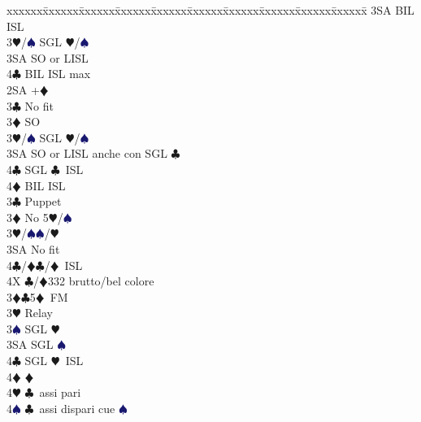 \documentclass[a4paper,italian]{article}
\newcommand{\BC}{\textcolor{OliveGreen}{$\clubsuit$}}
\newcommand{\BD}{\textcolor{RedOrange}{$\vardiamondsuit$}}
\newcommand{\BH}{\textcolor{Red2}{$\varheartsuit${}}}
\newcommand{\BS}{\textcolor{MidnightBlue}{$\spadesuit${}}}
\newenvironment{bidtable}
{\begin{tabbing}

    xxxxxx\=xxxxxx\=xxxxxx\=xxxxxx\=xxxxxx\=xxxxxx\=xxxxxx\=xxxxxx\=xxxxxx\=xxxxxx\=\kill}
{\end{tabbing} }%
\begin{document}
\begin{multicols}{2}
\begin{bidtable}
                                            3SA \> BIL ISL\-\-\\
                                            3\BH/\BS \> SGL \BH /\BS \\
                                            3SA \> SO or LISL\\
                                            4\BC \> BIL ISL max\-\-\\
                                            2SA +\BD \+\\
                                            3\BC \> No fit\+\\
                                            3\BD \> SO\\
                                            3\BH/\BS \> SGL \BH /\BS \\
                                            3SA \> SO or LISL anche con SGL \BC\\
                                            4\BC \> SGL \BC\ ISL\\
                                            4\BD \> BIL ISL\-\-\\
                                            3\BC \> Puppet\+\\
                                            3\BD \> No 5\BH /\BS \+\\
                                            3\BH/\BS {}\BS /\BH \+\\
                                            3SA \> No fit\+\\
                                            4\BC/\BD {}\BC /\BD\ ISL\-\-\\
                                            4X \BC /\BD 332 brutto/bel colore\-\-\\
                                            3\BD {}\BC 5\BD\ FM\+\\
                                            3\BH \> Relay\+\\
                                            3\BS \> SGL \BH \\
                                            3SA \> SGL \BS \\
                                            4\BC \> SGL \BH\ ISL\+\\
                                            4\BD \> \BD \\
                                            4\BH \> \BC\ assi pari\\
                                            4\BS \> \BC\ assi dispari cue \BS \\

\end{bidtable}
\end{multicols}
\end{document}
